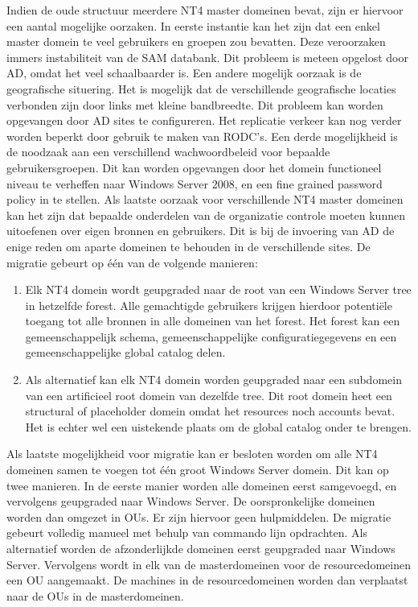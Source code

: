 Indien de oude structuur meerdere NT4 master domeinen bevat, zijn er hiervoor
een aantal mogelijke oorzaken. In eerste instantie kan het zijn dat een enkel
master domein te veel gebruikers en groepen zou bevatten. Deze veroorzaken
immers instabiliteit van de SAM databank. Dit probleem is meteen opgelost door
AD, omdat het veel schaalbaarder is. Een andere mogelijk oorzaak is de
geografische situering. Het is mogelijk dat de verschillende geografische
locaties verbonden zijn door links met kleine bandbreedte. Dit probleem kan
worden opgevangen door AD sites te configureren. Het replicatie verkeer kan nog
verder worden beperkt door gebruik te maken van RODC's. Een derde mogelijkheid
is de noodzaak aan een verschillend wachwoordbeleid voor bepaalde
gebruikersgroepen. Dit kan worden opgevangen door het domein functioneel niveau
te verheffen naar Windows Server 2008, en een fine grained password policy in te
stellen. Als laatste oorzaak voor verschillende NT4 master domeinen kan het zijn
dat bepaalde onderdelen van de organizatie controle moeten kunnen uitoefenen
over eigen bronnen en gebruikers. Dit is bij de invoering van AD de enige reden
om aparte domeinen te behouden in de verschillende sites. De migratie gebeurt op
één van de volgende manieren:
\begin{enumerate}
	\item Elk NT4 domein wordt geupgraded naar de root van een Windows
		Server tree in hetzelfde forest. Alle gemachtigde gebruikers
		krijgen hierdoor potentiële toegang tot alle bronnen in alle
		domeinen van het forest. Het forest kan een gemeenschappelijk
		schema, gemeenschappelijke configuratiegegevens en een
		gemeenschappelijke global catalog delen.
	\item Als alternatief kan elk NT4 domein worden geupgraded naar een
		subdomein van een artificieel root domein van dezelfde tree. Dit
		root domein heet een structural of placeholder domein omdat het
		resources noch accounts bevat. Het is echter wel een uistekende
		plaats om de global catalog onder te brengen.
\end{enumerate}

Als laatste mogelijkheid voor migratie kan er besloten worden om alle NT4
domeinen samen te voegen tot één groot Windows Server domein. Dit kan op twee
manieren. In de eerste manier worden alle domeinen eerst samgevoegd, en
vervolgens geupgraded naar Windows Server. De oorspronkelijke domeinen worden
dan omgezet in OUs. Er zijn hiervoor geen hulpmiddelen. De migratie gebeurt
volledig manueel met behulp van commando lijn opdrachten. Als alternatief worden
de afzonderlijkde domeinen eerst geupgraded naar Windows Server. Vervolgens
wordt in elk van de masterdomeinen voor de resourcedomeinen een OU aangemaakt.
De machines in de resourcedomeinen worden dan verplaatst naar de OUs in de
masterdomeinen.
